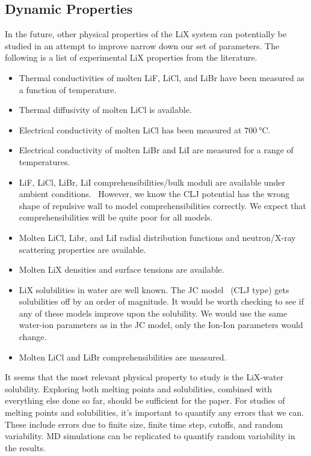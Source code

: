 \documentclass[aip,preprint,amsmath,amssymb,hidelinks]{revtex4-1}
\begin{document}
	\subsection{Dynamic Properties}
	
	In the future, other physical properties of the LiX system can potentially be studied in an attempt to improve narrow down our set of parameters. The following is a list of experimental LiX properties from the literature.
	\begin{itemize}
	\item Thermal conductivities of molten LiF, LiCl, and LiBr have been measured as a function of temperature.~\cite{smirnov1987thermal}
	\item Thermal diffusivity of molten LiCl is available.~\cite{nagasaka1992experimental}
	\item Electrical conductivity of molten LiCl has been measured at $\SI{700}{\degreeCelsius}$.~\cite{edwards1952electrical}
	\item Electrical conductivity of molten LiBr and LiI are measured for a range of temperatures.~\cite{yaffe1956electrical}
	\item LiF, LiCl, LiBr, LiI comprehensibilities/bulk moduli are available under ambient conditions.~\cite{slater1924compressibility,vaidya1971compressibility} However, we know the CLJ potential has the wrong shape of repulsive wall to model comprehensibilities correctly. We expect that comprehensibilities will be quite poor for all models.
	\item Molten LiCl, Libr, and LiI radial distribution functions and neutron/X-ray scattering properties are available.~\cite{levy1960x}
	\item Molten LiX densities and surface tensions are available.~\cite{smirnov1982density}
	\item LiX solubilities in water are well known. The JC model~\cite{Joung2008} (CLJ type) gets solubilities off by an order of magnitude. It would be worth checking to see if any of these models improve upon the solubility. We would use the same water-ion parameters as in the JC model, only the Ion-Ion parameters would change.
	\item Molten LiCl and LiBr comprehensibilities are measured.~\cite{bockris1957compressibilities}
	\end{itemize}

	It seems that the most relevant physical property to study is the LiX-water solubility. Exploring both melting points and solubilities, combined with everything else done so far, should be sufficient for the paper. For studies of melting points and solubilities, it's important to quantify any errors that we can. These include errors due to finite size, finite time step, cutoffs, and random variability. MD simulations can be replicated to quantify random variability in the results.
	
\end{document}

